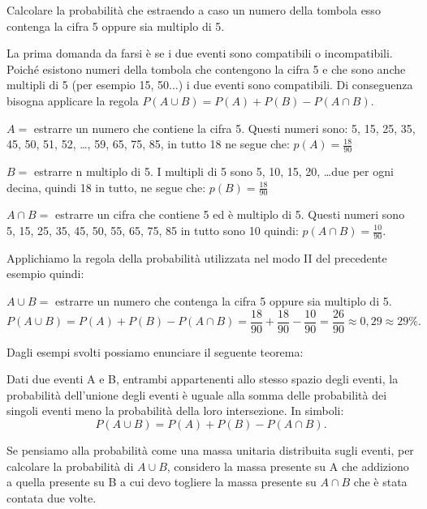 \begin{esempio}
Calcolare la probabilità che estraendo a caso un numero della tombola esso 
contenga la cifra 5 oppure sia multiplo di 5.

La prima domanda da farsi è se i due eventi sono compatibili o incompatibili. 
Poiché esistono numeri della tombola che contengono la cifra 5 e che sono 
anche 
multipli di 5 (per esempio 15, 50...) i due eventi sono compatibili. Di 
conseguenza bisogna applicare la regola $P(A\cup B)=P(A)+P(B)-P(A\cap B)$.
\begin{itemize*}
\item $ A = $ estrarre un numero che contiene la cifra 5. Questi numeri sono: 
5, 
15, 25, 35, 45, 50, 51, 52, \dots, 59, 65, 75, 85, in tutto 18 ne segue che: 
$p(A)=\frac{18}{90}$
\item $ B = $ estrarre n multiplo di 5. I multipli di 5 sono 5, 10, 15, 20, 
\dots due per ogni decina, quindi 18 in tutto, ne segue che: 
$p(B)=\frac{18}{90}$
\item $A\cap B =$ estrarre un cifra che contiene 5 ed è multiplo di 5. Questi 
numeri sono 5, 15, 25, 35, 45, 50, 55, 65, 75, 85 in tutto sono 10 quindi: 
$p(A\cap B)=\frac{10}{90}$.
\end{itemize*}
Applichiamo la regola della probabilità utilizzata nel modo II del precedente 
esempio quindi:

$A\cup B =$ estrarre un numero che contenga la cifra 5 oppure sia multiplo di 
5. 
\[ P(A\cup B)=P(A)+P(B)-P(A\cap 
B)=\frac{18}{90}+\frac{18}{90}-\frac{10}{90}=\frac{26}{90}\approx 0,29\approx 
29\%. \]
\end{esempio}

Dagli esempi svolti possiamo enunciare il seguente teorema:

\begin{teorema}
Dati due eventi A e B, entrambi appartenenti allo stesso spazio degli eventi, 
la 
probabilità dell'unione degli eventi è uguale alla somma delle probabilità 
dei 
singoli eventi meno la probabilità della loro intersezione.
In simboli: \[ P(A\cup B)=P(A)+P(B)-P(A\cap B). \]
\end{teorema}
Se pensiamo alla probabilità come una massa unitaria distribuita sugli 
eventi, 
per calcolare la probabilità di $A\cup B$, considero la massa presente su A 
che 
addiziono a quella presente su B a cui devo togliere la massa presente su 
$A\cap 
B$ che è stata contata due volte.

